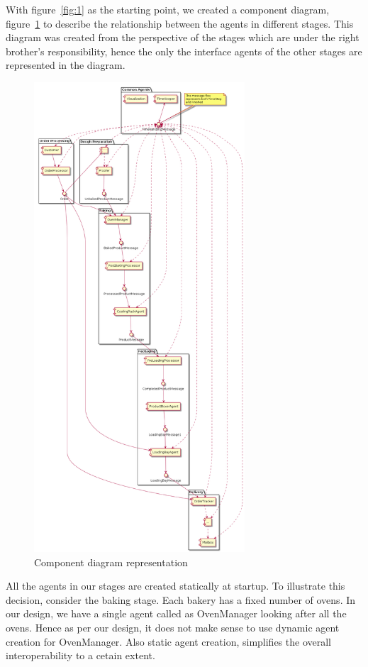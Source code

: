 \documentclass[12pt]{article}
\begin{document}
With figure~\ref{fig:1} as the starting point, we created a component diagram, figure~\ref{fig:2} to describe the relationship between the agents in different stages. This diagram was created from the perspective of the stages which are under the right brother's responsibility, hence the only the interface agents of the other stages are represented in the diagram.
 
\begin{figure}[H]
  \centering
  \includegraphics[width=0.7\textwidth]{component_diagram.png}
  \caption{Component diagram representation}
  \label{fig:2}
\end{figure}

All the agents in our stages are created statically at startup. 
To illustrate this decision, consider the baking stage. Each bakery has a fixed number of ovens. In our design, we have a single agent called as OvenManager looking after all the ovens. Hence as per our design, it does not make sense to use dynamic agent creation for OvenManager. Also static agent creation, simplifies the overall interoperability to a cetain extent.
\end{document}
